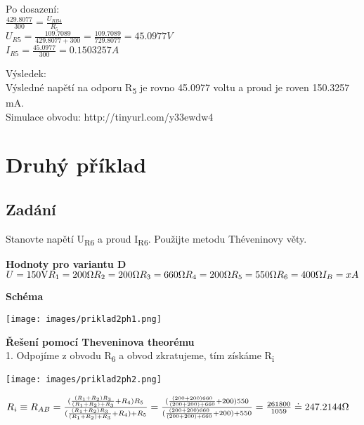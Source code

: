 \documentclass[12pt,a4paper]{article} %
\begin{document}
        \medskip
        Po dosazení:
        \medskip
        \\$\frac{429.8077}{300} = \frac{U_{RB4}}{R_5}$
        \medskip    
        \\$U_{R5} = \frac{109.7089}{429.8077 + 300} = \frac{109.7089}{729.8077} = 45.0977 V $
        \medskip
        \\$I_{R5} = \frac{45.0977}{300} =  0.1503257 A$
        \bigskip
        
        Výsledek:
        \\Výsledné napětí na odporu R\textsubscript{5} je rovno 45.0977 voltu a proud je roven 150.3257 mA.
        \medskip
        \\Simulace obvodu: http://tinyurl.com/y33ewdw4
	\clearpage

	\section{Druhý příklad} %
		\subsection*{Zadání}
		Stanovte napětí U\textsubscript{R6} a proud I\textsubscript{R6}. Použijte metodu Théveninovy věty.
		
		\textbf{Hodnoty pro variantu D}
		\(
		\\U = 150 \text{V}
	    \\R_1 = 200 \Omega 
	    \\R_2 = 200 \Omega
	    \\R_3 = 660 \Omega 
	    \\R_4 = 200 \Omega 
	    \\R_5 = 550 \Omega
	    \\R_6 = 400 \Omega
	    \\I_B = x A
	    \)
		\bigskip
		
		\textbf{Schéma}
		\medskip

		\centerline{
		\texttt{[image: images/priklad2ph1.png]}
		}
		\clearpage
		\textbf{Řešení pomocí Theveninova theorému}
		\\1. Odpojíme z obvodu R\textsubscript{6} a obvod zkratujeme, tím získáme R\textsubscript{i}
		
		\centerline{
		\texttt{[image: images/priklad2ph2.png]}
		}
		
		\medskip
		\(
		\\R_i \equiv R_{AB} = \frac{ (\frac{(R_1 + R_2)R_3}{(R_1 + R_2)+R_3} + R_4)R_5}{(\frac{(R_1 + R_2)R_3}{(R_1 + R_2)+R_3} + R_4)+R_5} = \frac{ (\frac{(200 + 200)660}{(200 + 200)+660} + 200)550}{(\frac{(200 + 200)660}{(200 + 200)+660} + 200)+550} =\frac{261800}{1059} \doteq 247.2144 \Omega
	    \)
	    
\end{document}
